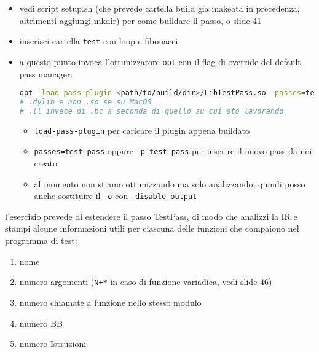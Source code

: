 \begin{emphasize-blue}
    \begin{itemize}
      \item vedi script setup.sh (che prevede cartella build gia makeata in precedenza, altrimenti aggiungi mkdir) per come buildare il passo, o slide 41
      \item inserisci cartella \lstinline|test| con loop e fibonacci
      \item a questo punto invoca l'ottimizzatore \lstinline|opt| con il flag di override del default pass manager:
        \begin{lstlisting}[language=bash]
opt -load-pass-plugin <path/to/build/dir>/LibTestPass.so -passes=test-pass test/Loop.bc -o test/LoopTestPass.bc
# .dylib e non .so se su MacOS
# .ll invece di .bc a seconda di quello su cui sto lavorando\end{lstlisting}
       \begin{itemize}
         \item \lstinline|load-pass-plugin| per caricare il plugin appena buildato
         \item \lstinline|passes=test-pass| oppure \lstinline|-p test-pass| per inserire il nuovo pass da noi creato
         \item al momento non stiamo ottimizzando ma solo analizzando, quindi posso anche sostituire il \lstinline|-o| con \lstinline|-disable-output|
       \end{itemize}
        
    \end{itemize}
    
\end{emphasize-blue}

l'esercizio prevede di estendere il passo TestPass, di modo che analizzi la IR e stampi alcune informazioni utili per ciascuna delle funzioni che compaiono nel programma di test:
\begin{enumerate}
  \item nome
  \item numero argomenti (\lstinline|N+*| in caso di funzione variadica, vedi slide 46)
  \item numero chiamate a funzione nello stesso modulo
  \item numero BB
  \item numero Istruzioni
\end{enumerate}






